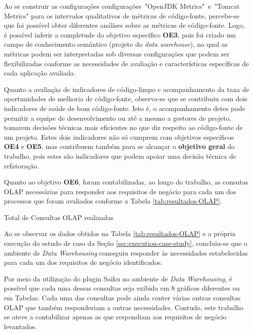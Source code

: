 Ao se construir as configurações configurações~"OpenJDK Metrics"~e~"Tomcat Metrics" para os intervalos qualitativos de métricas de código-fonte, percebe-se que foi possível obter diferentes análises sobre as métricas de código-fonte. Logo, é possível inferir a completude do objetivo específico \textbf{OE3}, pois foi criado um campo de conhecimento semântico (projeto do \textit{data warehouse}), no qual as métricas podem ser interpretadas sob diversas configurações que podem ser flexibilizadas conforme as necessidades de avaliação e características específicas de cada aplicação avaliada.

Quanto a avaliação de indicadores de código-limpo e acompanhamento da taxa de oportunidades de melhoria de código-fonte, observa-se que se contribuiu com dois indicadores de saúde de bom código-fonte. Isto é, o acompanhamento detes pode permitir a equipe de desenvolvimento ou até a mesmo a gestores de projeto, tomarem decisões técnicas mais eficientes no que diz respeito ao código-fonte de um projeto. Estes dois indicadores não só cumprem com objetivos específicos \textbf{OE4} e \textbf{OE5}, mas contribuem também para se alcançar o \textbf{objetivo geral} do trabalho, pois estes são indicadores que podem apoiar uma decisão técnica de refatoração.

Quanto ao objetivo \textbf{OE6}, foram contabilizadas, ao longo do trabalho, as consutas OLAP necessárias para responder aos requisitos de negócio para cada um dos processos que foram avaliados conforme a Tabela \ref{tab:resultados-OLAP}.

 
\begin{table}[H]
\begin{center}

\caption{Total de Consultas OLAP realizadas}
\label{tab:resultados-OLAP}
\end{center}
\end{table}
\FloatBarrier


Ao se observar os dados obtidos na Tabela \ref{tab:resultados-OLAP} e a própria execução do estudo de caso da Seção \ref{sec:execution-case-study}, concluiu-se que o ambiente de \textit{Data Warehousing} conseguiu responder às necessidades estabelecidas para cada um dos requisitos de negócio identificados. 

Por meio da utilização do plugin Saiku no ambiente de \textit{Data Warehousing}, é possível que cada uma dessas consultas seja exibida em 8 gráficos diferentes ou em Tabelas. Cada uma das consultas pode ainda conter várias outras consultas OLAP que também responderiam a outras necessidades. Contudo, este trabalho se ateve a contabilizar apenas as que respondiam aos requisitos de negócio levantados.

